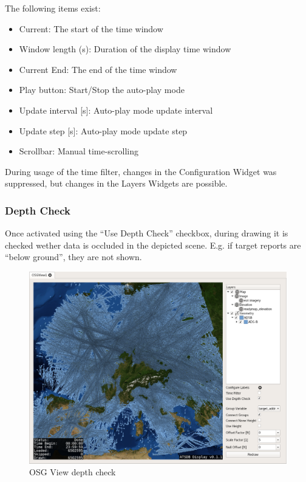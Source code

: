{The following items exist:

\begin{itemize}
 \item Current: The start of the time window
 \item Window length (s): Duration of the display time window
 \item Current End: The end of the time window
 \item Play button: Start/Stop the auto-play mode
 \item Update interval [s]: Auto-play mode update interval
 \item Update step [s]: Auto-play mode update step
 \item Scrollbar: Manual time-scrolling
\end{itemize}

During usage of the time filter, changes in the Configuration Widget was suppressed, but changes in the Layers Widgets are possible.

\subsubsection{Depth Check}

Once activated using the ``Use Depth Check'' checkbox, during drawing it is checked wether data is occluded in the depicted scene. E.g. if target reports are ``below ground'', they are not shown.

\begin{figure}[H]
    \hspace*{-2cm}
    \includegraphics[width=18cm,frame]{../screenshots/osgview_depth_check.png}
  \caption{OSG View depth check}
\end{figure}

}
